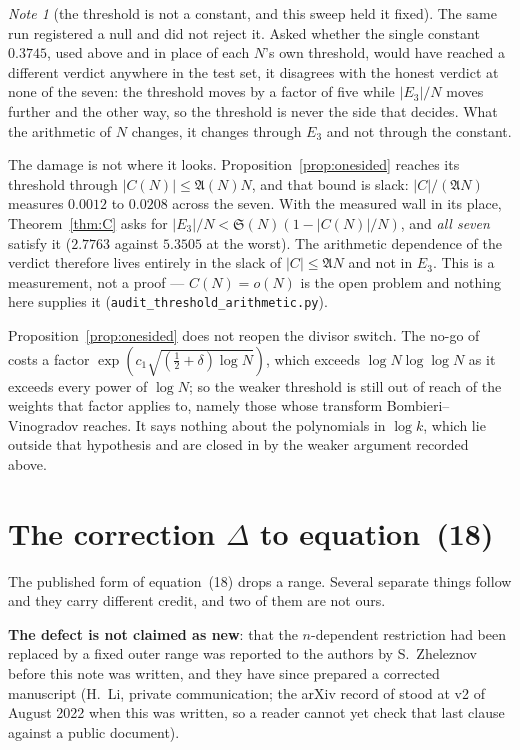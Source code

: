 \documentclass[11pt,a4paper]{article}
\theoremstyle{plain}
\theoremstyle{definition}
\theoremstyle{remark}
\newtheorem{note}[theorem]{Note}
\renewcommand{\SS}{\mathfrak{S}}
\newcommand{\AAA}{\mathfrak{A}}
\begin{document}
\begin{note}[the threshold is not a constant, and this sweep held it
fixed]
The same run registered a null and did not reject it. Asked whether the
single constant $0.3745$, used above and in place of each $N$'s own
threshold, would have reached a different verdict anywhere in the test
set, it disagrees with the honest verdict at none of the seven: the
threshold moves by a factor of five while $|E_3|/N$ moves further and
the other way, so the threshold is never the side that decides. What
the arithmetic of $N$ changes, it changes through $E_3$ and not through
the constant.

The damage is not where it looks. Proposition~\ref{prop:onesided}
reaches its threshold through $|C(N)|\le\AAA(N)N$, and that bound is
slack: $|C|/(\AAA N)$ measures $0.0012$ to $0.0208$ across the seven.
With the measured wall in its place, Theorem~\ref{thm:C} asks for
$|E_3|/N<\SS(N)(1-|C(N)|/N)$, and \emph{all seven} satisfy it
($2.7763$ against $5.3505$ at the worst). The arithmetic dependence of
the verdict therefore lives entirely in the slack of $|C|\le\AAA N$
and not in $E_3$. This is a measurement, not a proof --- $C(N)=o(N)$ is
the open problem and nothing here supplies it
(\texttt{audit\_threshold\_arithmetic.py}).
\end{note}

Proposition~\ref{prop:onesided} does not reopen the divisor switch.
The no-go of \cite{P2} costs a factor
$\exp(c_1\sqrt{(\tfrac12+\delta)\log N})$, which exceeds
$\log N\log\log N$ as
it exceeds every power of $\log N$; so the weaker threshold is still
out of reach of the weights that factor applies to, namely those
whose transform Bombieri--Vinogradov reaches. It says nothing about
the polynomials in $\log k$, which lie outside that hypothesis and
are closed in \cite{P2} by the weaker argument recorded above.

\section{The correction \texorpdfstring{$\Delta$}{Delta} to
equation~(18)}\label{sec:delta}

The published form of equation~(18) drops a range. Several separate
things follow and they carry different credit, and two of them are not
ours.

\textbf{The defect is not claimed as new}: that the $n$-dependent
restriction had been replaced by a fixed outer range was reported to
the authors by S.~Zheleznov before this note was written, and they have
since prepared a corrected manuscript (H.~Li, private communication;
the arXiv record of \cite{HL} stood at v2 of August 2022 when this was
written, so a reader cannot yet check that last clause against a public
document).
\end{document}
